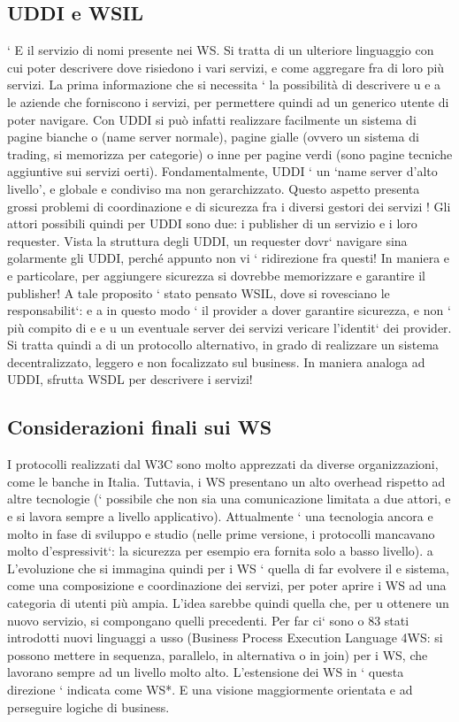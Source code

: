 \documentclass[a4paper,12pt]{article}
\begin{document}
\subsection{UDDI e WSIL}
`
E il servizio di nomi presente nei WS. Si tratta di un ulteriore linguaggio con
cui poter descrivere dove risiedono i vari servizi, e come aggregare fra di loro
più servizi. La prima informazione che si necessita ` la possibilità di descrivere
u
e
a
le aziende che forniscono i servizi, per permettere quindi ad un generico utente
di poter navigare.
Con UDDI si può infatti realizzare facilmente un sistema di pagine bianche
o
(name server normale), pagine gialle (ovvero un sistema di trading, si memorizza per categorie) o inne per pagine verdi
(sono pagine tecniche aggiuntive
sui servizi oerti). Fondamentalmente, UDDI ` un {`}name server d'alto livello',
e
globale e condiviso ma non gerarchizzato. Questo aspetto presenta grossi problemi di coordinazione e di sicurezza fra i
diversi gestori dei servizi !
Gli attori possibili quindi per UDDI sono due: i publisher di un servizio e i
loro requester. Vista la struttura degli UDDI, un requester dovr` navigare sina
golarmente gli UDDI, perché appunto non vi ` ridirezione fra questi! In maniera
e
e
particolare, per aggiungere sicurezza si dovrebbe memorizzare e garantire il publisher!
A tale proposito ` stato pensato WSIL, dove si rovesciano le responsabilit`:
e
a
in questo modo ` il provider a dover garantire sicurezza, e non ` più compito di
e
e u
un eventuale server dei servizi vericare l'identit` dei provider. Si tratta quindi
a
di un protocollo alternativo, in grado di realizzare un sistema decentralizzato,
leggero e non focalizzato sul business. In maniera analoga ad UDDI, sfrutta
WSDL per descrivere i servizi!
\subsection{Considerazioni finali sui WS}
I protocolli realizzati dal W3C sono molto apprezzati da diverse organizzazioni,
come le banche in Italia. Tuttavia, i WS presentano un alto overhead rispetto ad
altre tecnologie (` possibile che non sia una comunicazione limitata a due attori,
e
e si lavora sempre a livello applicativo). Attualmente ` una tecnologia ancora
e
molto in fase di sviluppo e studio (nelle prime versione, i protocolli mancavano
molto d'espressivit`: la sicurezza per esempio era fornita solo a basso livello).
a
L'evoluzione che si immagina quindi per i WS ` quella di far evolvere il
e
sistema, come una composizione e coordinazione dei servizi, per poter aprire i
WS ad una categoria di utenti più ampia. L'idea sarebbe quindi quella che, per
u
ottenere un nuovo servizio, si compongano quelli precedenti. Per far ci` sono
o
83
stati introdotti nuovi linguaggi a usso (Business Process Execution Language
4WS: si possono mettere in sequenza, parallelo, in alternativa o in join) per
i WS, che lavorano sempre ad un livello molto alto. L'estensione dei WS in
`
questa direzione ` indicata come WS*. E una visione maggiormente orientata
e
ad perseguire logiche di business.
\end{document}
